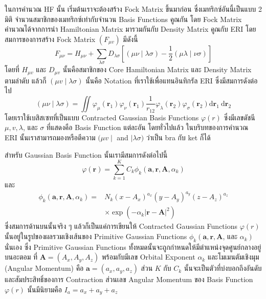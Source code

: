 ในการคำนวณ HF นั้น เริ่มต้นเราจะต้องสร้าง Fock Matrix ขึ้นมาก่อน ซึ่งเมทริกซ์อันนี้เป็นแบบ 2 มิติ จำนวนสมาชิกของเมทริกซ์เท่ากับจำนวน Basis Functions คูณกัน โดย Fock Matrix คำนวณได้จากการนำ Hamiltonian Matrix มารวมกันกับ Density Matrix คูณกับ ERI โดยสมการของการสร้าง Fock Matrix $(F_{\mu v})$ มีดังนี้
%
\begin{equation}
  F_{\mu \nu}
  =
  H_{\mu \nu}
  + \sum_{\lambda \sigma} D_{\lambda \sigma}\left[(\mu \nu \mid \lambda \sigma)
    - \frac{1}{2}(\mu \lambda \mid \nu \sigma)\right]
\end{equation}
%
โดยที่ $H_{\mu v}$ และ $D_{\mu v}$ นั้นคือสมาชิกของ Core Hamiltonian Matrix และ Density Matrix ตามลำดับ แล้วก็ $(\mu v \mid \lambda \sigma)$ นั้นคือ Notation ที่เราใช้เพื่อแทนอินทิกรัล ERI ซึ่งมีสมการดังต่อไป
%
\begin{equation}
  (\mu \nu \mid \lambda \sigma)
  =
  \iint \varphi_\mu\left(\boldsymbol{r}_1\right) \varphi_\nu\left(\boldsymbol{r}_1\right)
  \frac{1}{r_{12}}
  \varphi_\lambda\left(\boldsymbol{r}_2\right) \varphi_\sigma\left(\boldsymbol{r}_2\right)
  \mathrm{d} \boldsymbol{r}_1 \mathrm{~d} \boldsymbol{r}_2
\end{equation}
%
โดยเราใช้เบสิสเซทที่เป็นแบบ Contracted Gaussian Basis Functions $\varphi(r)$ ซึ่งมีเลขดัชนี $\mu, v, \lambda$, และ $\sigma$ ที่แสดงคือ Basis Function แต่ละอัน โดยทั่วไปแล้ว ในบริบทของการคำนวณ ERI นั้นเราสามารถมองหรือตีความ $(\mu v \mid$ and $\mid \lambda \sigma)$ ว่าเป็น bra กับ ket ก็ได้

สำหรับ Gaussian Basis Function นั้นเรามีสมการดังต่อไปนี้
%
\begin{equation}
  \varphi(\boldsymbol{r})
  =
  \sum_{k=1}^K C_k \phi_k\left(\boldsymbol{a}, \boldsymbol{r}, \boldsymbol{A}, \alpha_k\right)
\end{equation}
%
และ
%
\begin{equation}
  \begin{aligned}
    \phi_k\left(\boldsymbol{a}, \boldsymbol{r}, \boldsymbol{A}, \alpha_k\right)
    =
     & N_k\left(x-A_x\right)^{a_x}\left(y-A_y\right)^{a_y}\left(z-A_z\right)^{a_z} \\
     & \times \exp \left(-\alpha_k|\boldsymbol{r}-\boldsymbol{A}|^2\right)
  \end{aligned}
\end{equation}
%
ซึ่งสมการด้านบนนั้นจริง ๆ แล้วก็เป็นแค่การเขียนให้ Contracted Gaussian Functions $\varphi(r)$ นั้นอยู่ในรูปของผลรวมเชิงเส้นของ Primitive Gaussian Functions $\phi_k\left(\boldsymbol{a}, \boldsymbol{r}, \boldsymbol{A}\right.$, และ $\left.\alpha_k\right)$ นั่นเอง ซึ่ง Primitive Gaussian Functions ทั้งหมดนั้นจะถูกกำหนดให้มีตำแหน่งจุดศูนย์กลางอยู่บนอะตอม ที่ $\boldsymbol{A} = \left(A_x, A_y, A_z\right)$ พร้อมกับมีเลข Orbital Exponent $\alpha_k$ และโมเมนตัมเชิงมุม (Angular Momentum) คือ $\boldsymbol{a} = \left(a_x, a_y, a_z\right)$ ส่วน $K$ กับ $C_k$ นั้นจะเป็นตัวที่บ่งบอกถึงอันดับและสัมประสิทธิ์ของการ Contraction ส่วนเลข Angular Momentum ของ Basis Function $\varphi(r)$ นั้นมีนิยามคือ $I_a = a_x + a_y + a_z$

